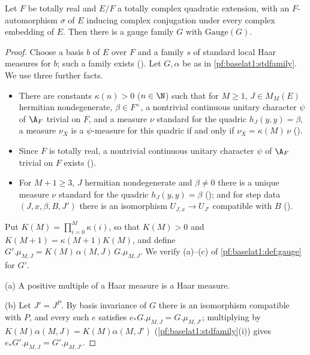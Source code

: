 \begin{theorem}\label{pf:baselat1:gaugeCM}
Let $F$ be totally real and $E/F$ a totally complex quadratic extension, with an $F$-automorphism $\sigma$ of $E$
inducing complex conjugation under every complex embedding of $E$. Then there is a gauge family $G$ with
$\mathrm{Gauge}(G)$.
\end{theorem}

\begin{proof}
Choose a basis $b$ of $E$ over $F$ and a family $s$ of standard local Haar measures for $b$; such a family exists
(). Let $G,\alpha$ be as in
\cref{pf:baselat1:stdfamily}. We use three further facts.
\begin{itemize}
\item There are constants $\kappa(n)>0$ ($n\in\N$) such that for $M\ge1$, $J\in M_M(E)$ hermitian nondegenerate,
  $\beta\in F^\times$, a nontrivial continuous unitary character $\psi$ of $\A_F$ trivial on $F$, and a measure $\nu$
  standard for the quadric $h_J(y,y)=\beta$, a measure $\nu_X$ is a $\psi$-measure for this quadric if and only if
  $\nu_X=\kappa(M)\,\nu$ ().
\item Since $F$ is totally real, a nontrivial continuous unitary character $\psi$ of $\A_F$ trivial on $F$ exists
  ().
\item For $M+1\ge3$, $J$ hermitian nondegenerate and $\beta\ne0$ there is a unique measure $\nu$ standard for the
  quadric $h_J(y,y)=\beta$ (); and for
  step data $(J,x,\beta,B,J')$ there is an isomorphism $U_{J,x}\to U_{J'}$ compatible with $B$
  ().
\end{itemize}
Put $K(M)=\prod_{i=0}^{M}\kappa(i)$, so that $K(M)>0$ and $K(M+1)=\kappa(M+1)K(M)$, and define
$G'.\mu_{M,J}=K(M)\,\alpha(M,J)\,G.\mu_{M,J}$. We verify (a)--(c) of \cref{pf:baselat1:def:gauge} for $G'$.

(a) A positive multiple of a Haar measure is a Haar measure.

(b) Let $J'=J^P$. By basis invariance of $G$ there is an isomorphism compatible with $P$, and every such $e$ satisfies
$e_*G.\mu_{M,J}=G.\mu_{M,J'}$; multiplying by $K(M)\alpha(M,J)=K(M)\alpha(M,J')$ (\cref{pf:baselat1:stdfamily}(i)) gives
$e_*G'.\mu_{M,J}=G'.\mu_{M,J'}$.


\end{proof}
